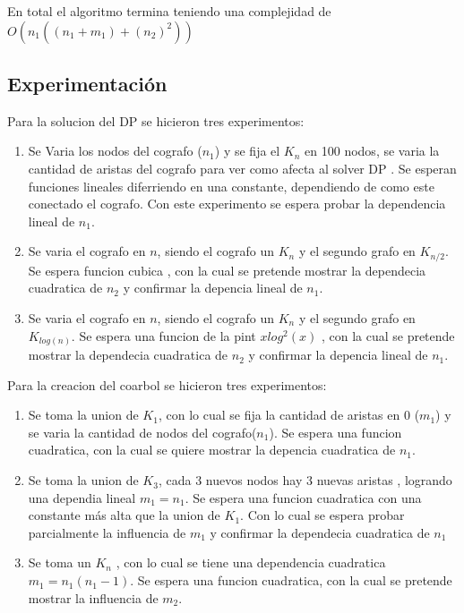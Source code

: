 En total el algoritmo termina teniendo una complejidad de $O(n_1((n_1 + m_1) + (n_2)^2 ))$

\subsection{Experimentación}

    

    Para la solucion del DP se hicieron tres experimentos:

    \begin{enumerate}
        \item Se Varia los nodos del cografo ($n_1$) y se fija el $K_n$ en 100 nodos, se varia la cantidad de aristas del cografo para ver como afecta al solver DP . Se esperan funciones lineales diferriendo en una constante, dependiendo de como este conectado el cografo. Con este experimento se espera probar la dependencia lineal de $n_1$.
        \item Se varia el cografo en $n$, siendo el cografo un $K_n$  y el segundo grafo en $K_{n/2}$. Se espera funcion cubica , con la cual se pretende mostrar la dependecia cuadratica de $n_2$ y confirmar la depencia lineal de $n_1$.
        \item Se varia el cografo en $n$, siendo el cografo un $K_n$  y el segundo grafo en $K_{log(n)}$. Se espera una funcion de la pint $xlog^2(x)$ , con la cual se pretende mostrar la dependecia cuadratica de $n_2$ y confirmar la depencia lineal de $n_1$.
    \end{enumerate}

    Para la creacion del coarbol se hicieron tres experimentos:

    \begin{enumerate}

        \item Se toma la union de $K_1$, con lo cual se fija la cantidad de aristas en $0$ ($m_1$) y se varia la cantidad de nodos del cografo($n_1$). Se espera una funcion cuadratica, con la cual se quiere mostrar la depencia cuadratica de $n_1$.
        \item Se toma la union de $K_3$, cada 3 nuevos nodos hay 3 nuevas aristas , logrando una dependia lineal $m_1 = n_1$. Se espera una funcion cuadratica con una constante más alta que la union de $K_1$. Con lo cual se espera probar parcialmente la influencia de $m_1$ y confirmar la dependecia cuadratica de $n_1$
        \item Se toma un $K_n$ , con lo cual se tiene una dependencia cuadratica $m_1 = n_1(n_1 - 1)$. Se espera una funcion cuadratica, con la cual se pretende mostrar la influencia de $m_2$.

    \end{enumerate}


